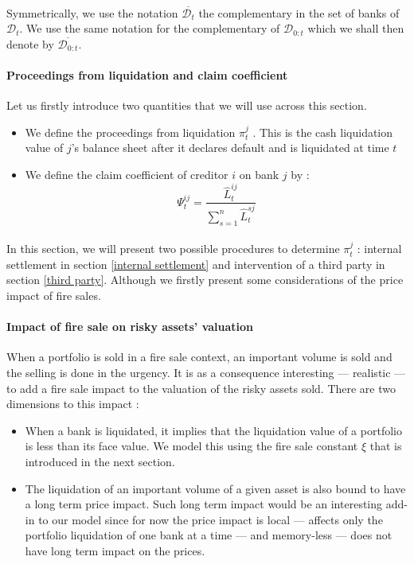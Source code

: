 \documentclass{article}
\newcommand{\wh}{\widehat}
\begin{document}
\paragraph{}
Symmetrically, we use the notation $\overline{\mathcal{D}_{t}}$ the complementary in the set of banks of $\mathcal{D}_{t}$. We use the same notation for the complementary of $\mathcal{D}_{0:t}$ which we shall then denote by $\overline{\mathcal{D}_{0:t}}$.


\paragraph{Proceedings from liquidation and claim coefficient}
Let us firstly introduce two quantities that we will use across this section. 

\begin{itemize}

\item We define the proceedings from liquidation $\pi_t^j$ . This is the cash liquidation value of $j$'s balance sheet after it declares default and is liquidated at time $t$
\item We define the claim coefficient of creditor $i$ on bank $j$ by :
$$\Psi_t^{ij} = \frac{\wh L_t^{ij}}{\sum_{s=1}^n \wh L_t^{sj}} $$

\end{itemize}

\paragraph{}
In this section, we will present two possible procedures to determine $\pi_t^j$ : internal settlement in section \ref{internal settlement} and intervention of a third party in section \ref{third party}. Although we firstly present some considerations of the price impact of fire sales.

\paragraph{Impact of fire sale on risky assets' valuation}
When a portfolio is sold in a fire sale context, an important volume is sold and the selling is done in the urgency. It is as a consequence interesting --- realistic --- to add a fire sale impact to the valuation of the risky assets sold. There are two dimensions to this impact :
\begin{itemize}
    \item When a bank is liquidated, it implies that the liquidation value of a portfolio is less than its face value. We model this using the fire sale constant $\xi$ that is introduced in the next section.
    \item The liquidation of an important volume of a given asset is also bound to have a long term price impact. Such long term impact would be an interesting add-in to our model since for now the price impact is local --- affects only the portfolio liquidation of one bank at a time --- and memory-less --- does not have long term impact on the prices.
\end{itemize}
\end{document}
